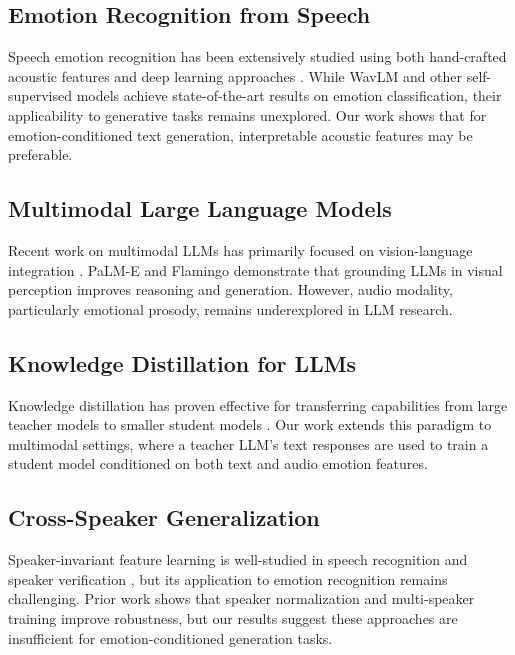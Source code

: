 \subsection{Emotion Recognition from Speech}
Speech emotion recognition has been extensively studied using both hand-crafted acoustic features \cite{eyben2010opensmile} and deep learning approaches \cite{chen2022wavlm,pepino2021emotion}. While WavLM \cite{chen2022wavlm} and other self-supervised models achieve state-of-the-art results on emotion classification, their applicability to generative tasks remains unexplored. Our work shows that for emotion-conditioned text generation, interpretable acoustic features may be preferable.

\subsection{Multimodal Large Language Models}
Recent work on multimodal LLMs has primarily focused on vision-language integration \cite{driess2023palm,alayrac2022flamingo,li2023blip}. PaLM-E \cite{driess2023palm} and Flamingo \cite{alayrac2022flamingo} demonstrate that grounding LLMs in visual perception improves reasoning and generation. However, audio modality, particularly emotional prosody, remains underexplored in LLM research.

\subsection{Knowledge Distillation for LLMs}
Knowledge distillation \cite{hinton2015distilling} has proven effective for transferring capabilities from large teacher models to smaller student models \cite{sanh2019distilbert}. Our work extends this paradigm to multimodal settings, where a teacher LLM's text responses are used to train a student model conditioned on both text and audio emotion features.

\subsection{Cross-Speaker Generalization}
Speaker-invariant feature learning is well-studied in speech recognition \cite{saon2013speaker} and speaker verification \cite{snyder2018x}, but its application to emotion recognition remains challenging. Prior work shows that speaker normalization \cite{zen2013statistical} and multi-speaker training \cite{dehak2011front} improve robustness, but our results suggest these approaches are insufficient for emotion-conditioned generation tasks.
